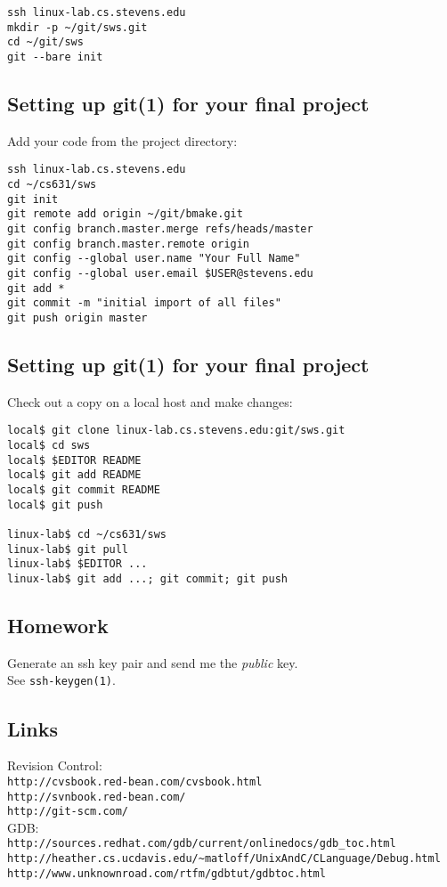 \documentclass[xga]{xdvislides}
\begin{document}
\begin{verbatim}
ssh linux-lab.cs.stevens.edu
mkdir -p ~/git/sws.git
cd ~/git/sws
git --bare init
\end{verbatim}

\subsection{Setting up git(1) for your final project}
Add your code from the project directory:
\\

\begin{verbatim}
ssh linux-lab.cs.stevens.edu
cd ~/cs631/sws
git init
git remote add origin ~/git/bmake.git
git config branch.master.merge refs/heads/master
git config branch.master.remote origin
git config --global user.name "Your Full Name"
git config --global user.email $USER@stevens.edu
git add *
git commit -m "initial import of all files"
git push origin master
\end{verbatim}

\subsection{Setting up git(1) for your final project}
Check out a copy on a local host and make changes:
\\

\begin{verbatim}
local$ git clone linux-lab.cs.stevens.edu:git/sws.git
local$ cd sws
local$ $EDITOR README
local$ git add README
local$ git commit README
local$ git push

linux-lab$ cd ~/cs631/sws
linux-lab$ git pull
linux-lab$ $EDITOR ...
linux-lab$ git add ...; git commit; git push
\end{verbatim}

\subsection{Homework}
Generate an ssh key pair and send me the {\em public} key. \\
See {\tt ssh-keygen(1)}.

\subsection{Links}
Revision Control: \\
{\tt http://cvsbook.red-bean.com/cvsbook.html} \\

{\tt http://svnbook.red-bean.com/} \\

{\tt http://git-scm.com/} \\

GDB: \\
{\tt http://sources.redhat.com/gdb/current/onlinedocs/gdb\_toc.html} \\

\verb+http://heather.cs.ucdavis.edu/~matloff/UnixAndC/CLanguage/Debug.html+ \\

{\tt http://www.unknownroad.com/rtfm/gdbtut/gdbtoc.html}
\end{document}
